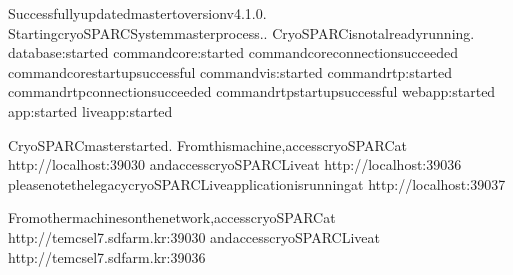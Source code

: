 \documentclass[a4paper,10pt,english]{sphinxmanual}
\begin{document}
\begin{sphinxVerbatim}[commandchars=\\\{\}]
Successfullyupdatedmastertoversionv4.1.0.
\PYGZhy{}\PYGZhy{}\PYGZhy{}
StartingcryoSPARCSystemmasterprocess..
CryoSPARCisnotalreadyrunning.
database:started
command\PYGZus{}core:started
command\PYGZus{}coreconnectionsucceeded
command\PYGZus{}corestartupsuccessful
command\PYGZus{}vis:started
command\PYGZus{}rtp:started
command\PYGZus{}rtpconnectionsucceeded
command\PYGZus{}rtpstartupsuccessful
webapp:started
app:started
liveapp:started
\PYGZhy{}\PYGZhy{}\PYGZhy{}\PYGZhy{}\PYGZhy{}\PYGZhy{}\PYGZhy{}\PYGZhy{}\PYGZhy{}\PYGZhy{}\PYGZhy{}\PYGZhy{}\PYGZhy{}\PYGZhy{}\PYGZhy{}\PYGZhy{}\PYGZhy{}\PYGZhy{}\PYGZhy{}\PYGZhy{}\PYGZhy{}\PYGZhy{}\PYGZhy{}\PYGZhy{}\PYGZhy{}\PYGZhy{}\PYGZhy{}\PYGZhy{}\PYGZhy{}\PYGZhy{}\PYGZhy{}\PYGZhy{}\PYGZhy{}\PYGZhy{}\PYGZhy{}\PYGZhy{}\PYGZhy{}\PYGZhy{}\PYGZhy{}\PYGZhy{}\PYGZhy{}\PYGZhy{}\PYGZhy{}\PYGZhy{}\PYGZhy{}\PYGZhy{}\PYGZhy{}\PYGZhy{}\PYGZhy{}\PYGZhy{}\PYGZhy{}\PYGZhy{}\PYGZhy{}

CryoSPARCmasterstarted.
Fromthismachine,accesscryoSPARCat
http://localhost:39030
andaccesscryoSPARCLiveat
http://localhost:39036
pleasenotethelegacycryoSPARCLiveapplicationisrunningat
http://localhost:39037

Fromothermachinesonthenetwork,accesscryoSPARCat
http://tem\PYGZhy{}cs\PYGZhy{}el7.sdfarm.kr:39030
andaccesscryoSPARCLiveat
http://tem\PYGZhy{}cs\PYGZhy{}el7.sdfarm.kr:39036



\end{sphinxVerbatim}
\end{document}

